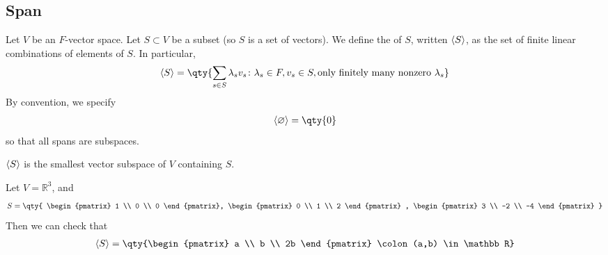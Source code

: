 \subsection{Span}
\begin{definition}
    Let $V$ be an $F$-vector space.
    Let $S \subset V$ be a subset (so $S$ is a set of vectors).
    We define the  of $S$, written $\langle{} S \rangle$, as the set of finite linear combinations of elements of $S$.
    In particular,
    \begin{align*}
        \genset{S} = \qty{ \sum_{s \in S} \lambda_s v_s \colon \lambda_s \in F, v_s \in S, \text{only finitely many nonzero } \lambda_s }
    \end{align*}
    By convention, we specify
    \begin{align*}
        \genset{\varnothing} = \qty{0}
    \end{align*}
    so that all spans are subspaces.
\end{definition}
\begin{remark}
    $\langle{} S \rangle$ is the smallest vector subspace of $V$ containing $S$.
\end{remark}
\begin{example}
    Let $V = \mathbb R^3$, and
    \begin{align*}
        S = \qty{ \begin{pmatrix}
                1 \\ 0 \\ 0
            \end{pmatrix}, \begin{pmatrix}
                0 \\ 1 \\ 2
            \end{pmatrix} , \begin{pmatrix}
            3 \\ -2 \\ -4
        \end{pmatrix} }
    \end{align*}
    Then we can check that
    \begin{align*}
        \genset{S} = \qty{\begin{pmatrix}
                a \\ b \\ 2b
            \end{pmatrix} \colon (a,b) \in \mathbb R}
    \end{align*}
\end{example}
